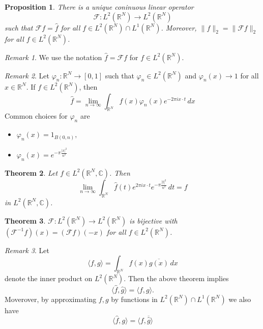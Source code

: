\documentclass[10pt, oneside, reqno]{amsart}
\theoremstyle{plain}%
\newtheorem{thm}{Theorem}[section]
\newtheorem{prop}[thm]{Proposition}
\theoremstyle{definition}
\theoremstyle{remark}
\newtheorem*{rem}{Remark}
\newcommand{\R}{\mathbb{R}}
\newcommand{\Com}{\mathbb{C}}
\renewcommand{\phi}{\varphi}
\begin{document}
\begin{prop}
    There is a unique coninuous linear operator \[
        \mathcal{F} : L^2(\R^N) \rightarrow L^2(\R^N)
    \] such that $\mathcal{F} f = \hat f$ for all $f \in L^2(\R^N) \cap L^1(\R^N)$.  Moreover, $\| f \|_2 = \| \mathcal{F} f \|_2$ for all $f \in L^2(\R^N)$.
\end{prop}

\begin{rem}
    We use the notation $\hat f = \mathcal{F} f$ for $f \in L^2(\R^N)$.  
\end{rem}
\begin{rem}
    Let $\phi_n : \R^N \rightarrow [0,1]$ such that $\phi_n \in L^2(\R^N)$ and $\phi_n(x) \rightarrow 1$ for all $x \in \R^N$. If $f \in L^2(\R^N)$, then \[
        \hat f = \lim_{n \rightarrow \infty} \int_{\R^N} f(x) \phi_n(x) e^{-2 \pi i x \cdot t} \, dx
    \]
    Common choices for $\phi_n$ are 
    \begin{itemize}
        \item $\phi_n(x) = 1_{B(0,n)},$
        \item $\phi_n(x) = e^{- \pi \frac{|x|^2}{n^2}}$
    \end{itemize}
\end{rem}

\begin{thm}
    Let $f \in L^2(\R^N, \Com)$.  Then \[
        \lim_{n \rightarrow \infty} \int_{\R^N} \hat f (t) e^{2 \pi i x \cdot t} e^{- \pi \frac{|t|^2}{n^2}} \, dt = f
    \] in $L^2(\R^N, \Com)$.
\end{thm}

\begin{thm}
    $\mathcal{F} : L^2(\R^N) \rightarrow L^2(\R^N)$ is bijective with $(\mathcal{F}^{-1} f) (x) = (\mathcal{F} f) (-x)$ for all $f \in L^2(\R^N)
$.
\end{thm}


\begin{rem}
    Let \[
        \langle f, g \rangle = \int_{\R^N} f(x) \overline{g(x)} \, dx
    \] denote the inner product on $L^2(\R^N)$.  Then the above theorem implies \[
        \langle \hat f, \hat g \rangle = \langle f, g \rangle.
    \]
    Moverover, by approximating $f,g$ by functions in $L^2(\R^N) \cap L^1(\R^N)$ we also have \[
        \langle \hat f, g \rangle = \langle f, \overline{\hat g} \rangle
    \]
\end{rem}

\end{document}
